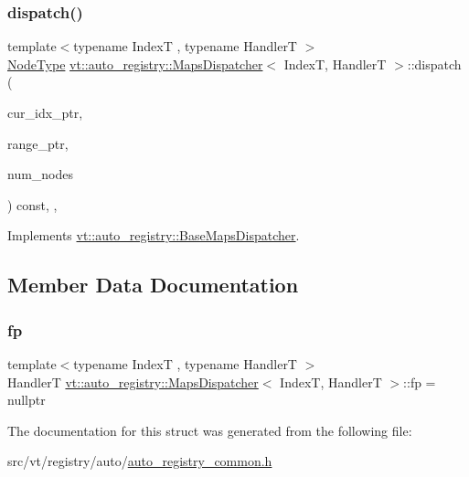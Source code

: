 \subsubsection{\texorpdfstring{dispatch()}{dispatch()}}
{\footnotesize\ttfamily template$<$typename IndexT , typename HandlerT $>$ \\
\hyperlink{namespacevt_a866da9d0efc19c0a1ce79e9e492f47e2}{Node\+Type} \hyperlink{structvt_1_1auto__registry_1_1_maps_dispatcher}{vt\+::auto\+\_\+registry\+::\+Maps\+Dispatcher}$<$ IndexT, HandlerT $>$\+::dispatch (\begin{DoxyParamCaption}\item[{\hyperlink{structvt_1_1index_1_1_base_index}{index\+::\+Base\+Index} $\ast$}]{cur\+\_\+idx\+\_\+ptr,  }\item[{\hyperlink{structvt_1_1index_1_1_base_index}{index\+::\+Base\+Index} $\ast$}]{range\+\_\+ptr,  }\item[{\hyperlink{namespacevt_a866da9d0efc19c0a1ce79e9e492f47e2}{Node\+Type}}]{num\+\_\+nodes }\end{DoxyParamCaption}) const\hspace{0.3cm}{\ttfamily [inline]}, {\ttfamily [override]}, {\ttfamily [virtual]}}



Implements \hyperlink{structvt_1_1auto__registry_1_1_base_maps_dispatcher_a36755202b288d1cb4eed6a57524b6398}{vt\+::auto\+\_\+registry\+::\+Base\+Maps\+Dispatcher}.



\subsection{Member Data Documentation}
\mbox{\label{structvt_1_1auto__registry_1_1_maps_dispatcher_a419a0598544b3d7430443ba4a2f6470e}} 
\subsubsection{\texorpdfstring{fp}{fp}}
{\footnotesize\ttfamily template$<$typename IndexT , typename HandlerT $>$ \\
HandlerT \hyperlink{structvt_1_1auto__registry_1_1_maps_dispatcher}{vt\+::auto\+\_\+registry\+::\+Maps\+Dispatcher}$<$ IndexT, HandlerT $>$\+::fp = nullptr\hspace{0.3cm}{\ttfamily [private]}}



The documentation for this struct was generated from the following file\+:\begin{DoxyCompactItemize}
\item 
src/vt/registry/auto/\hyperlink{auto__registry__common_8h}{auto\+\_\+registry\+\_\+common.\+h}\end{DoxyCompactItemize}
